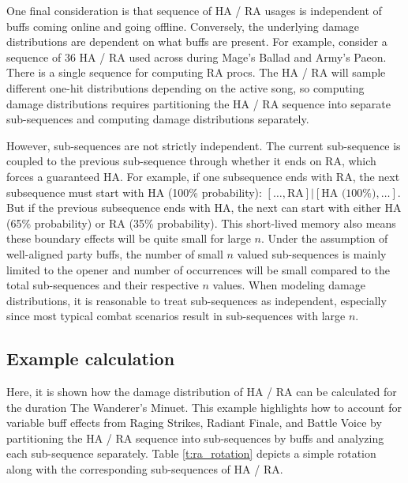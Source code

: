 One final consideration is that sequence of HA / RA usages is independent of buffs coming online and going offline. Conversely, the underlying damage distributions are dependent on what buffs are present. For example, consider a sequence of 36 HA / RA used across during Mage's Ballad and Army's Paeon. There is a single sequence for computing RA procs. The HA / RA will sample different one-hit distributions depending on the active song, so computing damage distributions requires partitioning the HA / RA sequence into separate sub-sequences and computing damage distributions separately. 


However, sub-sequences are not strictly independent. The current sub-sequence is coupled to the previous sub-sequence through whether it ends on RA, which forces a guaranteed HA. For example, if one subsequence ends with RA, the next subsequence must start with HA (100\% probability): $[\ldots, \text{RA}] | [\text{HA (100\%)}, \ldots]$. But if the previous subsequence ends with HA, the next can start with either HA (65\% probability) or RA (35\% probability). This short-lived memory also means these boundary effects will be quite small for large $n$. Under the assumption of well-aligned party buffs, the number of small $n$ valued sub-sequences is mainly limited to the opener and number of occurrences will be small compared to the total sub-sequences and their respective $n$ values. When modeling damage distributions, it is reasonable to treat sub-sequences as independent, especially since most typical combat scenarios result in sub-sequences with large $n$.

\subsection{Example calculation}

Here, it is shown how the damage distribution of HA / RA can be calculated for the duration The Wanderer's Minuet. This example highlights how to account for variable buff effects from Raging Strikes, Radiant Finale, and Battle Voice by partitioning the HA / RA sequence into sub-sequences by buffs and analyzing each sub-sequence separately. Table \ref{t:ra_rotation} depicts a simple rotation along with the corresponding sub-sequences of HA / RA.

